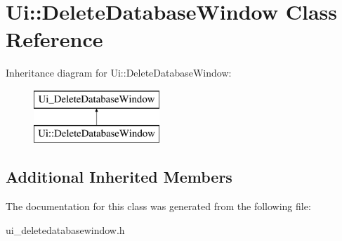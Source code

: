 \hypertarget{class_ui_1_1_delete_database_window}{}\section{Ui\+:\+:Delete\+Database\+Window Class Reference}
\label{class_ui_1_1_delete_database_window}
Inheritance diagram for Ui\+:\+:Delete\+Database\+Window\+:\begin{figure}[H]
\begin{center}
\leavevmode
\includegraphics[height=2.000000cm]{class_ui_1_1_delete_database_window}
\end{center}
\end{figure}
\subsection*{Additional Inherited Members}


The documentation for this class was generated from the following file\+:\begin{DoxyCompactItemize}
\item 
ui\+\_\+deletedatabasewindow.\+h\end{DoxyCompactItemize}

